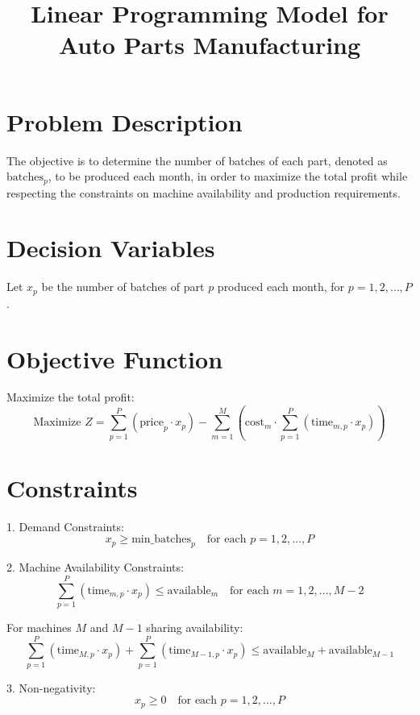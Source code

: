 \documentclass{article}
\begin{document}
\title{Linear Programming Model for Auto Parts Manufacturing}
\author{}
\date{}
\maketitle

\section*{Problem Description}

The objective is to determine the number of batches of each part, denoted as \( \text{batches}_p \), to be produced each month, in order to maximize the total profit while respecting the constraints on machine availability and production requirements.

\section*{Decision Variables}

Let \( x_p \) be the number of batches of part \( p \) produced each month, for \( p = 1, 2, \ldots, P \).

\section*{Objective Function}

Maximize the total profit:
\[
\text{Maximize } Z = \sum_{p=1}^{P} \left( \text{price}_p \cdot x_p \right) - \sum_{m=1}^{M} \left( \text{cost}_m \cdot \sum_{p=1}^{P} \left( \text{time}_{m,p} \cdot x_p \right) \right)
\]

\section*{Constraints}

1. Demand Constraints: 
   \[
   x_p \geq \text{min\_batches}_p \quad \text{for each } p = 1, 2, \ldots, P
   \]

2. Machine Availability Constraints:
   \[
   \sum_{p=1}^{P} \left( \text{time}_{m,p} \cdot x_p \right) \leq \text{available}_m \quad \text{for each } m = 1, 2, \ldots, M-2
   \]
   
   For machines \( M \) and \( M-1 \) sharing availability:
   \[
   \sum_{p=1}^{P} \left( \text{time}_{M,p} \cdot x_p \right) + \sum_{p=1}^{P} \left( \text{time}_{M-1,p} \cdot x_p \right) \leq \text{available}_M + \text{available}_{M-1}
   \]

3. Non-negativity:
   \[
   x_p \geq 0 \quad \text{for each } p = 1, 2, \ldots, P
   \]
\end{document}
